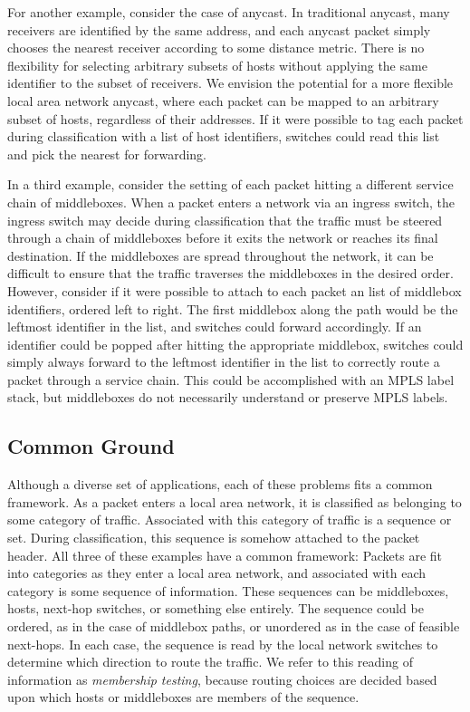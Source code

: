 For another example, consider the case of anycast. In traditional anycast, many receivers are identified by the same address, and each anycast packet simply chooses the nearest receiver according to some distance metric. There is no flexibility for selecting arbitrary subsets of hosts without applying the same identifier to the subset of receivers. We envision the potential for a more flexible local area network anycast, where each packet can be mapped to an arbitrary subset of hosts, regardless of their addresses. If it were possible to tag each packet during classification with a list of host identifiers, switches could read this list and pick the nearest for forwarding.

In a third example, consider the setting of each packet hitting a different service chain of middleboxes. When a packet enters a network via an ingress switch, the ingress switch may decide during classification that the traffic must be steered through a chain of middleboxes before it exits the network or reaches its final destination. If the middleboxes are spread throughout the network, it can be difficult to ensure that the traffic traverses the middleboxes in the desired order. However, consider if it were possible to attach to each packet an list of middlebox identifiers, ordered left to right. The first middlebox along the path would be the leftmost identifier in the list, and switches could forward accordingly. If an identifier could be popped after hitting the appropriate middlebox, switches could simply always forward to the leftmost identifier in the list to correctly route a packet through a service chain. This could be accomplished with an MPLS label stack, but middleboxes do not necessarily understand or preserve MPLS labels. 

\subsection{Common Ground}

Although a diverse set of applications, each of these problems fits a common framework. As a packet enters a local area network, it is classified as belonging to some category of traffic. Associated with this category of traffic is a sequence or set. During classification, this sequence is somehow attached to the packet header.
All three of these examples have a common framework: Packets are fit into categories as they enter a local area network, and associated with each category is some sequence of information. These sequences can be middleboxes, hosts, next-hop switches, or something else entirely. The sequence could be ordered, as in the case of middlebox paths, or unordered as in the case of feasible next-hops. In each case, the sequence is read by the local network switches to determine which direction to route the traffic. We refer to this reading of information as \textit{membership testing}, because routing choices are decided based upon which hosts or middleboxes are members of the sequence. 

